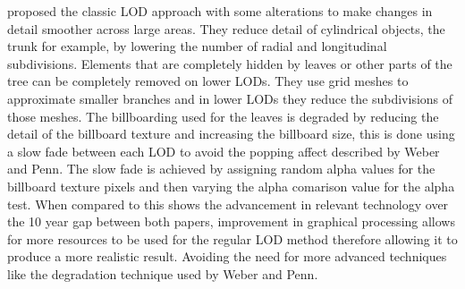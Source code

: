 \documentclass[review]{cmpreport}
\begin{document}
\cite{candussi2005rendering} proposed the classic LOD approach with some alterations to make 
changes in detail smoother across large areas. They reduce detail of cylindrical objects, 
the trunk for example, by lowering the number of radial and longitudinal subdivisions. 
Elements that are completely hidden by leaves or other parts of the tree can be completely 
removed on lower LODs. They use grid meshes to approximate smaller branches and in lower 
LODs they reduce the subdivisions of those meshes. The billboarding used for the leaves is 
degraded by reducing the detail of the billboard texture and increasing the billboard size, 
this is done using a slow fade between each LOD to avoid the popping affect described by 
Weber and Penn. The slow fade is achieved by assigning random alpha values for the billboard 
texture pixels and then varying the alpha comarison value for the alpha test. When compared 
to \cite{weber1995rendering} this shows the advancement in relevant technology over the 10 
year gap between both papers, improvement in graphical processing allows for more resources 
to be used for the regular LOD method therefore allowing it to produce a more realistic result. 
Avoiding the need for more advanced techniques like the degradation technique used by Weber and 
Penn.

\clearpage

\end{document}
